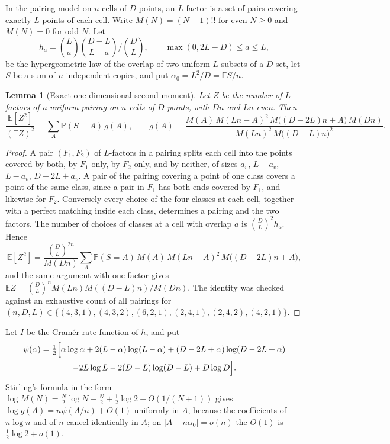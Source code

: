 \documentclass[11pt]{article}
\newtheorem{lemma}[theorem]{Lemma}
\newcommand{\EE}{\mathbb{E}}
\newcommand{\PP}{\mathbb{P}}
\begin{document}
In the pairing model on \(n\) cells of \(D\) points, an \(L\)-factor is a set of
pairs covering exactly \(L\) points of each cell. Write \(M(N)=(N-1)!!\) for
even \(N\ge0\) and \(M(N)=0\) for odd \(N\). Let
\[
h_a=\binom{L}{a}\binom{D-L}{L-a}\Big/\binom{D}{L},
\qquad
\max(0,2L-D)\le a\le L,
\]
be the hypergeometric law of the overlap of two uniform \(L\)-subsets of a
\(D\)-set, let \(S\) be a sum of \(n\) independent copies, and put
\(\alpha_0=L^2/D=\EE S/n\).

\begin{lemma}[Exact one-dimensional second moment]
\label{lem:factor-one-dim}
Let \(Z\) be the number of \(L\)-factors of a uniform pairing on \(n\) cells of
\(D\) points, with \(Dn\) and \(Ln\) even. Then
\[
\frac{\EE[Z^2]}{(\EE Z)^2}
=
\sum_{A}\PP(S=A)\,g(A),
\qquad
g(A)=\frac{M(A)\,M(Ln-A)^2\,M\bigl((D-2L)n+A\bigr)\,M(Dn)}
{M(Ln)^2\,M\bigl((D-L)n\bigr)^2}.
\]
\end{lemma}

\begin{proof}
A pair \((F_1,F_2)\) of \(L\)-factors in a pairing splits each cell into the
points covered by both, by \(F_1\) only, by \(F_2\) only, and by neither, of
sizes \(a_v\), \(L-a_v\), \(L-a_v\), \(D-2L+a_v\). A pair of the pairing
covering a point of one class covers a point of the same class, since a pair
in \(F_1\) has both ends covered by \(F_1\), and likewise for \(F_2\).
Conversely every choice of the four classes at each cell, together with a
perfect matching inside each class, determines a pairing and the two factors.
The number of choices of classes at a cell with overlap \(a\) is
\(\binom{D}{L}^2h_a\). Hence
\[
\EE[Z^2]
=
\frac{\binom{D}{L}^{2n}}{M(Dn)}
\sum_{A}\PP(S=A)\,M(A)\,M(Ln-A)^2\,M\bigl((D-2L)n+A\bigr),
\]
and the same argument with one factor gives
\(\EE Z=\binom{D}{L}^nM(Ln)M((D-L)n)/M(Dn)\).
The identity was checked against an exhaustive count of all pairings for
\((n,D,L)\in\{(4,3,1),(4,3,2),(6,2,1),(2,4,1),(2,4,2),(4,2,1)\}\).
\end{proof}

Let \(I\) be the Cram\'er rate function of \(h\), and put
\begin{multline*}
\psi(\alpha)
=
\tfrac12\Bigl[\alpha\log\alpha+2(L-\alpha)\log(L-\alpha)
+(D-2L+\alpha)\log(D-2L+\alpha)
\\
-2L\log L-2(D-L)\log(D-L)+D\log D\Bigr].
\end{multline*}
Stirling's formula in the form
\(\log M(N)=\tfrac N2\log N-\tfrac N2+\tfrac12\log2+O(1/(N+1))\) gives
\(\log g(A)=n\psi(A/n)+O(1)\) uniformly in \(A\), because the coefficients of
\(n\log n\) and of \(n\) cancel identically in \(A\); on
\(\lvert A-n\alpha_0\rvert=o(n)\) the \(O(1)\) is \(\tfrac12\log2+o(1)\).
\end{document}
